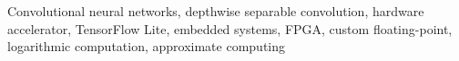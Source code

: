 \begin{keywords}
Convolutional neural networks, depthwise separable convolution, hardware accelerator, TensorFlow Lite, embedded systems, FPGA, custom floating-point, logarithmic computation, approximate computing
\end{keywords}

\titlepgskip=-15pt

\maketitle